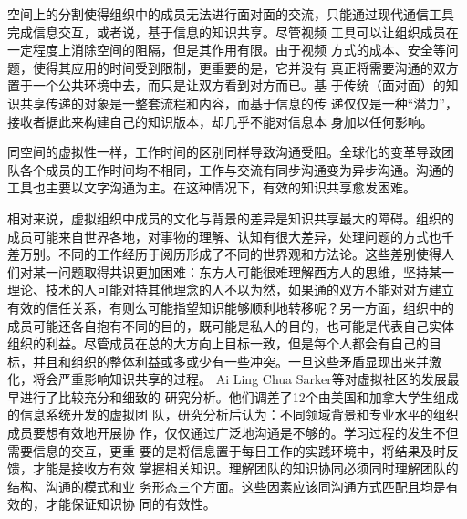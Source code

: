 \documentclass[12pt,a4paper]{ctexart}
\begin{document}
空间上的分割使得组织中的成员无法进行面对面的交流，只能通过现代通信工具
完成信息交互，或者说，基于信息的知识共享\cite{sveiby1996tka}。尽管视频
工具可以让组织成员在一定程度上消除空间的阻隔，但是其作用有限。由于视频
方式的成本、安全等问题，使得其应用的时间受到限制，更重要的是，它并没有
真正将需要沟通的双方置于一个公共环境中去，而只是让双方看到对方而已。基
于传统（面对面）的知识共享传递的对象是一整套流程和内容，而基于信息的传
递仅仅是一种“潜力”，接收者据此来构建自己的知识版本，却几乎不能对信息本
身加以任何影响。

同空间的虚拟性一样，工作时间的区别同样导致沟通受阻。全球化的变革导致团
队各个成员的工作时间均不相同，工作与交流有同步沟通变为异步沟通。沟通的
工具也主要以文字沟通为主。在这种情况下，有效的知识共享愈发困难。

相对来说，虚拟组织中成员的文化与背景的差异是知识共享最大的障碍。组织的
成员可能来自世界各地，对事物的理解、认知有很大差异，处理问题的方式也千
差万别。不同的工作经历于阅历形成了不同的世界观和方法论。这些差别使得人
们对某一问题取得共识更加困难：东方人可能很难理解西方人的思维，坚持某一
理论、技术的人可能对持其他理念的人不以为然，如果通的双方不能对对方建立
有效的信任关系，有则么可能指望知识能够顺利地转移呢？另一方面，组织中的
成员可能还各自抱有不同的目的，既可能是私人的目的，也可能是代表自己实体
组织的利益。尽管成员在总的大方向上目标一致，但是每个人都会有自己的目
标，并且和组织的整体利益或多或少有一些冲突。一旦这些矛盾显现出来并激
化，将会严重影响知识共享的过程。
Ai Ling Chua
Sarker等\cite{sarker2000uvt}对虚拟社区的发展最早进行了比较充分和细致的
研究分析。他们调差了12个由美国和加拿大学生组成的信息系统开发的虚拟团
队，研究分析后认为：不同领域背景和专业水平的组织成员要想有效地开展协
作，仅仅通过广泛地沟通是不够的。学习过程的发生不但需要信息的交互，更重
要的是将信息置于每日工作的实践环境中，将结果及时反馈，才能是接收方有效
掌握相关知识。理解团队的知识协同必须同时理解团队的结构、沟通的模式和业
务形态三个方面。这些因素应该同沟通方式匹配且均是有效的，才能保证知识协
同的有效性。
\end{document}
